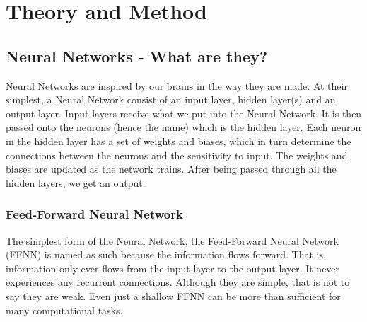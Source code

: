 \documentclass{article}
\begin{document}
\section{Theory and Method}
\subsection{Neural Networks - What are they?}
Neural Networks are inspired by our brains in the way they are made. At their simplest, a Neural Network consist of an input layer, hidden layer(s) and an output layer. Input layers receive what we put into the Neural Network. It is then passed onto the neurons (hence the name) which is the hidden layer. Each neuron in the hidden layer has a set of weights and biases, which in turn determine the connections between the neurons and the sensitivity to input. The weights and biases are updated as the network trains. After being passed through all the hidden layers, we get an output. \newline
\subsubsection{Feed-Forward Neural Network}
The simplest form of the Neural Network, the Feed-Forward Neural Network (FFNN) is named as such because the information flows forward. That is, information only ever flows from the input layer to the output layer. It never experiences any recurrent connections.
\newline Although they are simple, that is not to say they are weak. Even just a shallow FFNN can be more than sufficient for many computational tasks.
\end{document}
